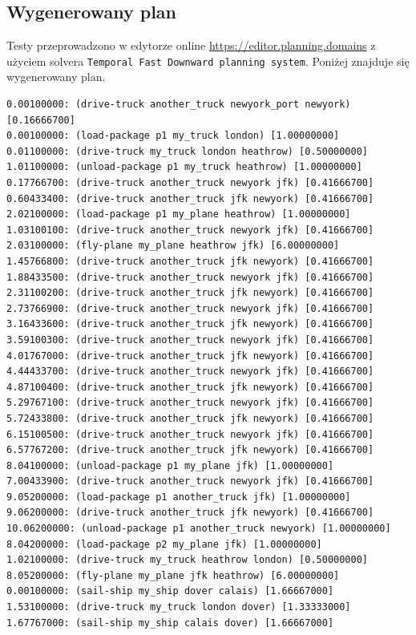 \documentclass[11pt,a4paper]{article}
\begin{document}
\subsection{Wygenerowany plan}
Testy przeprowadzono w edytorze online \url{https://editor.planning.domains} z użyciem solvera \texttt{Temporal Fast Downward planning system}. Poniżej znajduje się wygenerowany plan.
\begin{lstlisting}[caption=Fragment wygenerowanego planu dla Zadania 1, label=lst:plan_task1, basicstyle=\ttfamily\scriptsize, breaklines=true]
0.00100000: (drive-truck another_truck newyork_port newyork) [0.16666700]
0.00100000: (load-package p1 my_truck london) [1.00000000]
0.01100000: (drive-truck my_truck london heathrow) [0.50000000]
1.01100000: (unload-package p1 my_truck heathrow) [1.00000000]
0.17766700: (drive-truck another_truck newyork jfk) [0.41666700]
0.60433400: (drive-truck another_truck jfk newyork) [0.41666700]
2.02100000: (load-package p1 my_plane heathrow) [1.00000000]
1.03100100: (drive-truck another_truck newyork jfk) [0.41666700]
2.03100000: (fly-plane my_plane heathrow jfk) [6.00000000]
1.45766800: (drive-truck another_truck jfk newyork) [0.41666700]
1.88433500: (drive-truck another_truck newyork jfk) [0.41666700]
2.31100200: (drive-truck another_truck jfk newyork) [0.41666700]
2.73766900: (drive-truck another_truck newyork jfk) [0.41666700]
3.16433600: (drive-truck another_truck jfk newyork) [0.41666700]
3.59100300: (drive-truck another_truck newyork jfk) [0.41666700]
4.01767000: (drive-truck another_truck jfk newyork) [0.41666700]
4.44433700: (drive-truck another_truck newyork jfk) [0.41666700]
4.87100400: (drive-truck another_truck jfk newyork) [0.41666700]
5.29767100: (drive-truck another_truck newyork jfk) [0.41666700]
5.72433800: (drive-truck another_truck jfk newyork) [0.41666700]
6.15100500: (drive-truck another_truck newyork jfk) [0.41666700]
6.57767200: (drive-truck another_truck jfk newyork) [0.41666700]
8.04100000: (unload-package p1 my_plane jfk) [1.00000000]
7.00433900: (drive-truck another_truck newyork jfk) [0.41666700]
9.05200000: (load-package p1 another_truck jfk) [1.00000000]
9.06200000: (drive-truck another_truck jfk newyork) [0.41666700]
10.06200000: (unload-package p1 another_truck newyork) [1.00000000]
8.04200000: (load-package p2 my_plane jfk) [1.00000000]
1.02100000: (drive-truck my_truck heathrow london) [0.50000000]
8.05200000: (fly-plane my_plane jfk heathrow) [6.00000000]
0.00100000: (sail-ship my_ship dover calais) [1.66667000]
1.53100000: (drive-truck my_truck london dover) [1.33333000]
1.67767000: (sail-ship my_ship calais dover) [1.66667000]

\end{lstlisting}
\end{document}
